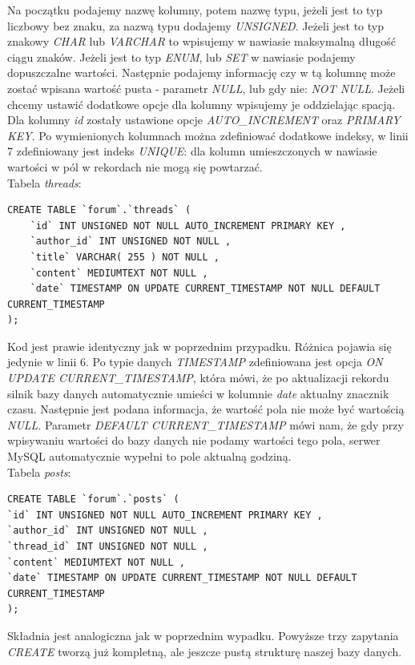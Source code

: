 \documentclass[a4paper,10pt]{article}
\begin{document}
Na początku podajemy nazwę kolumny, potem nazwę typu, jeżeli jest to typ liczbowy bez znaku, za nazwą typu dodajemy \textit{UNSIGNED}. Jeżeli jest to typ znakowy \textit{CHAR} lub \textit{VARCHAR} to wpisujemy w nawiasie maksymalną długość ciągu znaków. Jeżeli jest to typ \textit{ENUM}, lub \textit{SET} w nawiasie podajemy dopuszczalne wartości. Następnie podajemy informację czy w tą kolumnę może zostać wpisana wartość pusta - parametr \textit{NULL}, lub gdy nie: \textit{NOT NULL}. Jeżeli chcemy ustawić dodatkowe opcje dla kolumny wpisujemy je oddzielając spacją. Dla kolumny \textit{id} zostały ustawione opcje \textit{AUTO\_INCREMENT} oraz \textit{PRIMARY KEY}. Po wymienionych kolumnach można zdefiniować dodatkowe indeksy, w linii 7 zdefiniowany jest indeks \textit{UNIQUE}: dla kolumn umieszczonych w nawiasie wartości w pól w rekordach nie mogą się powtarzać. \\
Tabela \textit{threads}: \\
\begin{verbatim}
CREATE TABLE `forum`.`threads` (
	`id` INT UNSIGNED NOT NULL AUTO_INCREMENT PRIMARY KEY ,
	`author_id` INT UNSIGNED NOT NULL ,
	`title` VARCHAR( 255 ) NOT NULL ,
	`content` MEDIUMTEXT NOT NULL ,
	`date` TIMESTAMP ON UPDATE CURRENT_TIMESTAMP NOT NULL DEFAULT CURRENT_TIMESTAMP 
);
\end{verbatim}
Kod jest prawie identyczny jak w poprzednim przypadku. Różnica pojawia się jedynie w linii 6. Po typie danych \textit{TIMESTAMP} zdefiniowana jest opcja \textit{ON UPDATE CURRENT\_TIMESTAMP}, która mówi, że po aktualizacji rekordu silnik bazy danych automatycznie umieści w kolumnie \textit{date} aktualny znacznik czasu. Następnie jest podana informacja, że wartość pola nie może być wartością \textit{NULL}. Parametr \textit{DEFAULT CURRENT\_TIMESTAMP} mówi nam, że gdy przy wpisywaniu wartości do bazy danych nie podamy wartości tego pola, serwer MySQL automatycznie wypełni to pole aktualną godziną. \\
Tabela \textit{posts}: \\
\begin{verbatim}
CREATE TABLE `forum`.`posts` (
`id` INT UNSIGNED NOT NULL AUTO_INCREMENT PRIMARY KEY ,
`author_id` INT UNSIGNED NOT NULL ,
`thread_id` INT UNSIGNED NOT NULL ,
`content` MEDIUMTEXT NOT NULL ,
`date` TIMESTAMP ON UPDATE CURRENT_TIMESTAMP NOT NULL DEFAULT CURRENT_TIMESTAMP 
);
\end{verbatim}
Składnia jest analogiczna jak w poprzednim wypadku. Powyższe trzy zapytania \textit{CREATE} tworzą już kompletną, ale jeszcze pustą strukturę naszej bazy danych.
\end{document}
